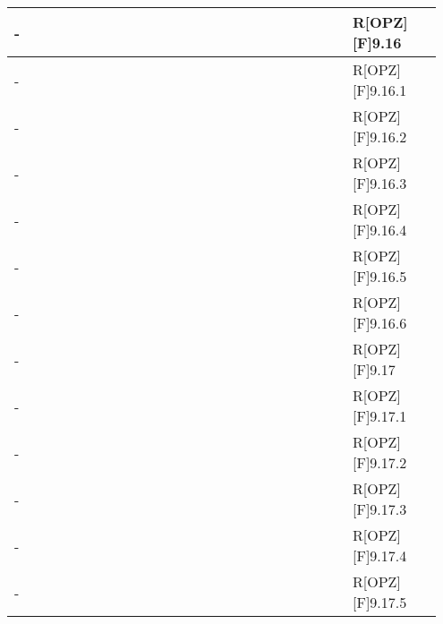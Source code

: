 \begin{table}[h]
\begin{center}
\begin{tabular}{|p{0.75\linewidth}|p{0.2\linewidth}|}
		\midrule
			- & R[OPZ][F]9.16 \\
		\midrule
			- & R[OPZ][F]9.16.1 \\
		\midrule
			- & R[OPZ][F]9.16.2 \\
		\midrule
			- & R[OPZ][F]9.16.3 \\
		\midrule
			- & R[OPZ][F]9.16.4 \\
		\midrule
			- & R[OPZ][F]9.16.5 \\
		\midrule
			- & R[OPZ][F]9.16.6 \\
		\midrule
			- & R[OPZ][F]9.17 \\
		\midrule
			- & R[OPZ][F]9.17.1 \\
		\midrule
			- & R[OPZ][F]9.17.2 \\
		\midrule
			- & R[OPZ][F]9.17.3 \\
		\midrule
			- & R[OPZ][F]9.17.4 \\
		\midrule
			- & R[OPZ][F]9.17.5 \\
		\bottomrule
		\end{tabular}
	\end{center}
\end{table}


